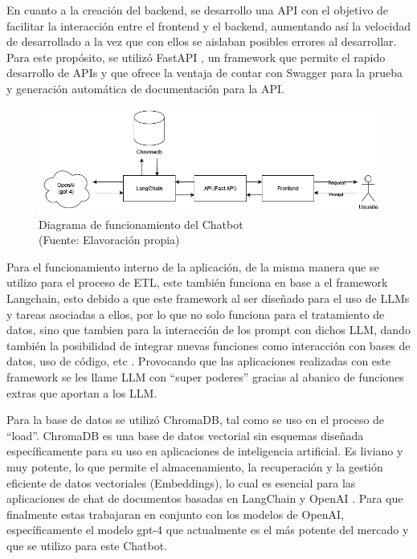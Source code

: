 En cuanto a la creación del backend, se desarrollo una API con el objetivo de facilitar la interacción entre el frontend y el backend, aumentando así la velocidad
de desarrollado a la vez que con ellos se aislaban posibles errores al desarrollar. Para este 
propósito, se utilizó FastAPI \cite{tiangoloFastAPI}, un framework que permite el rapido desarrollo de APIs y que ofrece la ventaja de contar con Swagger \cite{swaggerAPIDocumentation}
para la prueba y generación automática de documentación para la API.

\begin{figure}[ht!]
    \centering
    \includegraphics[width=.8\textwidth]{figures/finalhuemul.png}
    \caption[Diagrama de funcionamiento del Chatbot]{Diagrama de funcionamiento del Chatbot\\
    {\scriptsize (Fuente: Elavoración propia)}}
    \label{fig:chatbot1}
\end{figure}

Para el funcionamiento interno de la aplicación, de la misma manera que se utilizo para el proceso de ETL, 
este también funciona en base a el framework Langchain, esto debido a que este framework al ser diseñado para el 
uso de LLMs y tareas asociadas a ellos, por lo que no solo funciona para el tratamiento de datos, sino que tambien para la interacción 
de los prompt con dichos LLM, dando también la posibilidad de integrar nuevas funciones como interacción con 
bases de datos, uso de código, etc \cite{langchain1}. Provocando que las aplicaciones realizadas con este framework se les 
llame LLM con ``super poderes'' gracias al abanico de funciones extras que aportan a los LLM.

Para la base de datos se utilizó ChromaDB, tal como se uso en el proceso de ``load''. ChromaDB es una base de datos vectorial sin esquemas diseñada específicamente para 
su uso en aplicaciones de inteligencia artificial. Es liviano y muy potente, lo que permite el almacenamiento, la recuperación 
y la gestión eficiente de datos vectoriales (Embeddings), lo cual es esencial para las aplicaciones de chat de documentos 
basadas en LangChain y OpenAI \cite{langchain1}. Para que finalmente estas trabajaran en conjunto con los modelos de OpenAI, 
específicamente el modelo gpt-4 que actualmente es el más potente del mercado y que se utilizo para este Chatbot.

